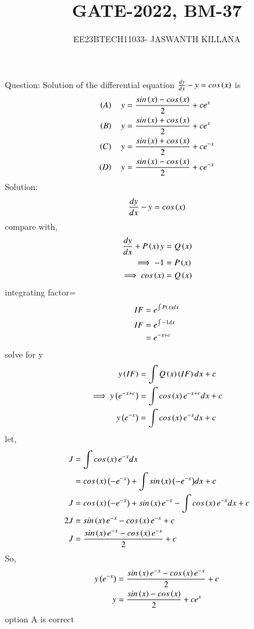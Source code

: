 \documentclass[journal,12pt,twocolumn]{IEEEtran}
\theoremstyle{remark}
\begin{document}

\vspace{3cm}

\title{GATE-2022, BM-37}
\author{EE23BTECH11033- JASWANTH KILLANA}
\maketitle
\newpage
\bigskip

\renewcommand{\thefigure}{\theenumi}
\renewcommand{\thetable}{\theenumi}
Question: Solution of the differential equation $\frac{dy}{dx}-y=cos\left(x\right)$ is
\begin{align}
\left(A\right)\quad y&=\frac{sin\left(x\right)-cos\left(x\right)}{2}+ce^x\\
\left(B\right)\quad y&=\frac{sin\left(x\right)+cos\left(x\right)}{2}+ce^x\\
\left(C\right)\quad y&=\frac{sin\left(x\right)+cos\left(x\right)}{2}+ce^{-x}\\
\left(D\right)\quad y&=\frac{sin\left(x\right)-cos\left(x\right)}{2}+ce^{-x}
\end{align}
Solution: \begin{align}\frac{dy}{dx}-y=cos\left(x\right)
\end{align}
compare with,
\begin{align}
\frac{dy}{dx}+P\left(x\right)y&=Q\left(x\right)\\
\implies -1&=P\left(x\right)\\
\implies cos\left(x\right)&=Q\left(x\right)
\end{align}
integrating factor=
\begin{align}
IF&=e^{\int P\left(x\right)dx}\\
IF&=e^{\int -1dx}\\
&=e^{-x+c}
\end{align}
solve for y
\begin{align}
y\left(IF\right)&=\int {Q\ensuremath{\left(x\right)}\ensuremath{\left(IF\right)}dx}+c\\
\implies y\left(e^{-x+c}\right)&=\int {cos\ensuremath{\left(x\right)}e^{-x+c}dx}+c\\
y\left(e^{-x}\right)&=\int {cos\ensuremath{\left(x\right)}e^{-x}dx}+c
\end{align}
let,
\begin{align}
J&=\int {cos\ensuremath{\left(x\right)}e^{-x}dx}\\
&=cos\left(x\right)\left(-e^{-x}\right)+\int {sin\ensuremath{\left(x\right)}\ensuremath{\left(-e^{-x}\right)}}dx+c\\
J&=cos\left(x\right)\left(-e^{-x}\right)+sin\left(x\right) e^{-x}-\int{cos\ensuremath{\left(x\right)}e^{-x}dx}+c\\
 2J&=sin\left(x\right) e^{-x}-cos\left(x\right)e^{-x}+c\\
 J&=\frac{sin\left(x\right) e^{-x}-cos\left(x\right)e^{-x}}{2}+c
\end{align}
So,
\begin{align}
y\left(e^{-x}\right)&=\frac{sin\left(x\right) e^{-x}-cos\left(x\right)e^{-x}}{2}+c\\
y&=\frac{sin\left(x\right)-cos\left(x\right)}{2}+ce^{x}\\
\end{align}
option A is correct
\end{document}
